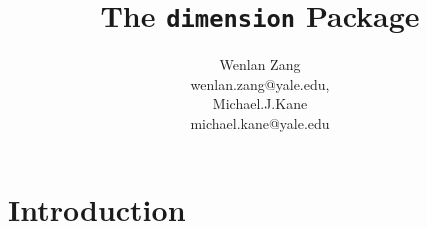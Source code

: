 \documentclass[12pt]{article}
\title{The {\tt dimension} Package}
\author{Wenlan Zang \\
wenlan.zang@yale.edu,
\\[6pt]
Michael.J.Kane\\
michael.kane@yale.edu
}
\begin{document}


\maketitle

\thispagestyle{empty}

\section{Introduction}
\end{document}
